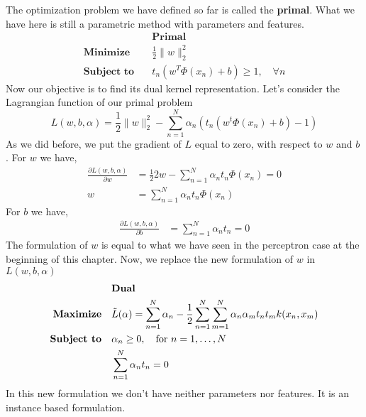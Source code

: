 \documentclass[main.tex]{subfiles}
\begin{document}
The optimization problem we have defined so far is called the \textbf{primal}. What we have here is still a parametric method with parameters and features. 
\begin{align*}
    &\textbf{Primal} \\
    \textbf{Minimize} \quad &\frac{1}{2} \|w\|_2^2 \\
    \textbf{Subject to} \quad &t_n (w^T \Phi(x_n) + b) \geq 1, \quad \forall n
\end{align*}
Now our objective is to find its dual kernel representation.
Let's consider the Lagrangian function of our primal problem\footnotemark {}
\begin{equation}
    L(w,b,\alpha) = \frac{1}{2} \|w\|_2^2 - \sum_{n=1}^N \alpha_n (t_n(w^t \Phi(x_n) + b) - 1)
\end{equation}
\newpage
As we did before, we put the gradient of $L$ equal to zero, with respect to $w$ and $b$ \footnotemark.  
\newline
For $w$ we have,
\begin{align*}
    \frac{\partial L(w,b,\alpha)}{\partial w} &= \frac{1}{2} 2w - \sum_{n=1}^N \alpha_n t_n \Phi(x_n) = 0 \\
    w &= \sum_{n=1}^N \alpha_n t_n \Phi(x_n)
\end{align*}
For $b$ we have,
\begin{align*}
    \frac{\partial L(w,b,\alpha)}{\partial b} &= \sum_{n=1}^N \alpha_n t_n = 0
\end{align*}
The formulation of $w$ is equal to what we have seen in the perceptron case at the beginning of this chapter. Now, we replace the new formulation of $w$ in $L(w,b,\alpha)$
\begin{align*}
    &\textbf{Dual} \\
    \textbf{Maximize} \quad &\Tilde{L}(\alpha) = \sum_{n=1}^N \alpha_n - \frac{1}{2}\sum_{n=1}^N \sum_{m=1}^N \alpha_n \alpha_m t_n t_m k(x_n,x_m) \\
    \textbf{Subject to} \quad &\alpha_n \geq 0, \quad \text{for } n=1, \dots, N \\
    &\sum_{n=1}^N \alpha_n t_n = 0
\end{align*}
In this new formulation we don't have neither parameters nor features. It is an instance based formulation. 
\end{document}
